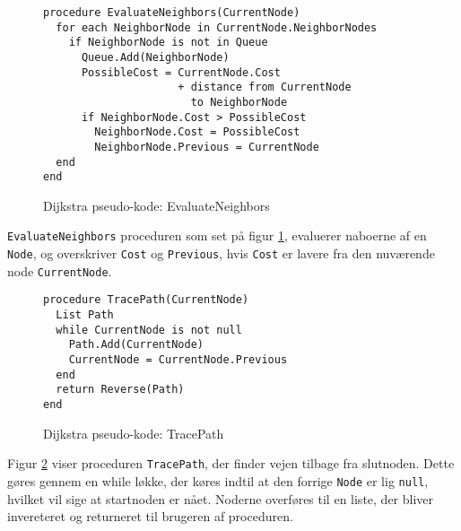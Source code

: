 \begin{figure}[H]
\begin{lstlisting}
procedure EvaluateNeighbors(CurrentNode)
  for each NeighborNode in CurrentNode.NeighborNodes
    if NeighborNode is not in Queue
      Queue.Add(NeighborNode)
      PossibleCost = CurrentNode.Cost 
                     + distance from CurrentNode
                       to NeighborNode
      if NeighborNode.Cost > PossibleCost
        NeighborNode.Cost = PossibleCost
        NeighborNode.Previous = CurrentNode
  end
end
\end{lstlisting}
\caption{Dijkstra pseudo-kode: EvaluateNeighbors}\label{DijkstraCodeEvaluateNeighbors}
\end{figure}

\texttt{EvaluateNeighbors} proceduren som set på figur \ref{DijkstraCodeEvaluateNeighbors}, evaluerer naboerne af en \texttt{Node}, og overskriver \texttt{Cost} og \texttt{Previous}, hvis \texttt{Cost} er lavere fra den nuværende node \texttt{CurrentNode}. 

\begin{figure}[H]
\begin{lstlisting}
procedure TracePath(CurrentNode)
  List Path
  while CurrentNode is not null
    Path.Add(CurrentNode)
    CurrentNode = CurrentNode.Previous
  end
  return Reverse(Path)
end
\end{lstlisting}
\caption{Dijkstra pseudo-kode: TracePath}\label{DijkstraCodeTracePath}
\end{figure}

Figur \ref{DijkstraCodeTracePath} viser proceduren \texttt{TracePath}, der finder vejen tilbage fra slutnoden. Dette gøres gennem en while løkke, der køres indtil at den forrige \texttt{Node} er lig \texttt{null}, hvilket vil sige at startnoden er nået. Noderne overføres til en liste, der bliver invereteret og returneret til brugeren af proceduren.